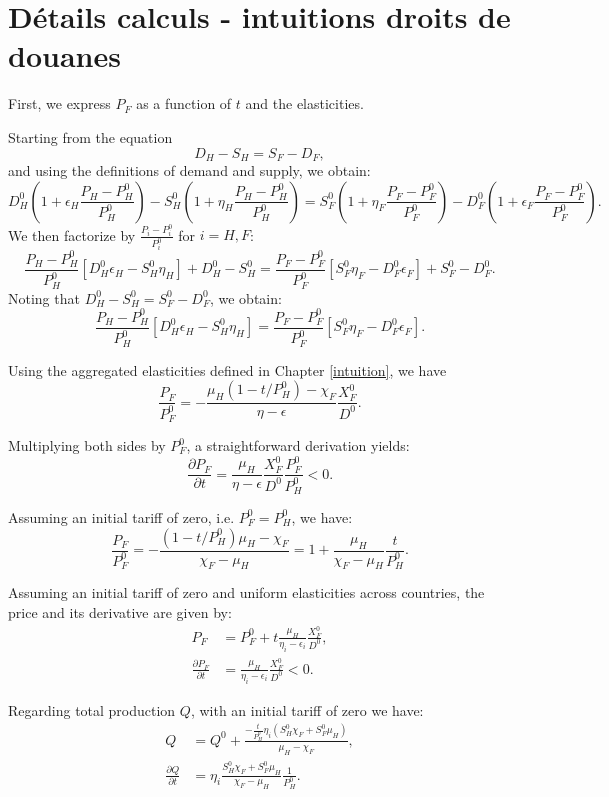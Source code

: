 \section{Détails calculs - intuitions droits de douanes}\label{appendix:intuitions_tariff}

First, we express $P_F$ as a function of $t$ and the elasticities.

Starting from the equation
$$
    D_H - S_H = S_F - D_F,
$$
and using the definitions of demand and supply, we obtain:
$$
    D_H^0\left(1+\epsilon_H \frac{P_H - P_H^0}{P_H^0}\right) - S_H^0\left(1+\eta_H \frac{P_H - P_H^0}{P_H^0}\right) = S_F^0 \left(1+\eta_F \frac{P_F - P_F^0}{P_F^0}\right) - D_F^0\left(1+\epsilon_F \frac{P_F - P_F^0}{P_F^0}\right).
$$
We then factorize by $\frac{P_i-P_i^0}{P_i^0}$ for $i = H,F$:
$$
    \frac{P_H - P_H^0}{P_H^0} [D_H^0 \epsilon_H - S_H^0 \eta_H] + D_H^0 - S_H^0 = \frac{P_F - P_F^0}{P_F^0} [S_F^0 \eta_F - D_F^0 \epsilon_F] + S_F^0 - D_F^0.
$$
Noting that $D_H^0 - S_H^0 = S_F^0 - D_F^0$, we obtain:
$$
    \frac{P_H - P_H^0}{P_H^0} [D_H^0 \epsilon_H - S_H^0 \eta_H] = \frac{P_F - P_F^0}{P_F^0} [S_F^0 \eta_F - D_F^0 \epsilon_F].
$$

Using the aggregated elasticities defined in Chapter \ref{intuition}, we have
$$
    \frac{P_F}{P_F^0}= -\frac{\mu_H (1 - t/P_H^0) - \chi_F}{\eta-\epsilon}\frac{X_F^0}{D^0}.
$$

Multiplying both sides by $P_F^0$, a straightforward derivation yields:
$$
    \frac{\partial P_F}{\partial t} = \frac{\mu_H}{\eta - \epsilon} \frac{X_F^0}{D^0} \frac{P_F^0}{P_H^0} < 0.
$$

Assuming an initial tariff of zero, i.e. $P_F^0 = P_H^0$, we have:
$$
    \frac{P_F}{P_F^0} = - \frac{(1 - t/P_H^0)\mu_H - \chi_F}{\chi_F - \mu_H} = 1+\frac{\mu_H}{\chi_F - \mu_H}\frac{t}{P_H^0}.
$$

Assuming an initial tariff of zero and uniform elasticities across countries, the price and its derivative are given by:
\begin{align*}
    P_F                             & = P_F^0 + t \frac{\mu_H}{\eta_i - \epsilon_i} \frac{X_F^0}{D^0}, \\
    \frac{\partial P_F}{\partial t} & = \frac{\mu_H}{\eta_i - \epsilon_i} \frac{X_F^0}{D^0} < 0.
\end{align*}

Regarding total production $Q$, with an initial tariff of zero we have:
\begin{align*}
    Q                             & = Q^0 + \frac{- \frac{t}{P_H^0}\eta_i(S_H^0 \chi_F + S_F^0 \mu_H)}{\mu_H - \chi_F}, \\
    \frac{\partial Q}{\partial t} & = \eta_i \frac{S_H^0 \chi_F + S_F^0 \mu_H}{\chi_F - \mu_H}\frac{1}{P_H^0}.
\end{align*}

